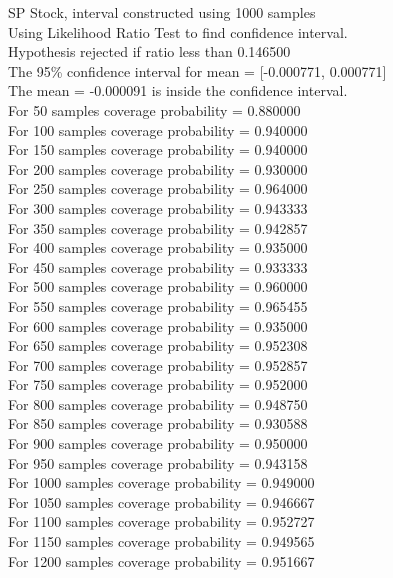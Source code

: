 \documentclass{article}
\begin{document}
SP Stock, interval constructed using 1000 samples\\
Using Likelihood Ratio Test to find confidence interval.\\
Hypothesis rejected if ratio less than 0.146500\\
The 95\% confidence interval for mean = [-0.000771, 0.000771]\\
The mean = -0.000091 is inside the confidence interval.\\
For 50 samples coverage probability = 0.880000\\
For 100 samples coverage probability = 0.940000\\
For 150 samples coverage probability = 0.940000\\
For 200 samples coverage probability = 0.930000\\
For 250 samples coverage probability = 0.964000\\
For 300 samples coverage probability = 0.943333\\
For 350 samples coverage probability = 0.942857\\
For 400 samples coverage probability = 0.935000\\
For 450 samples coverage probability = 0.933333\\
For 500 samples coverage probability = 0.960000\\
For 550 samples coverage probability = 0.965455\\
For 600 samples coverage probability = 0.935000\\
For 650 samples coverage probability = 0.952308\\
For 700 samples coverage probability = 0.952857\\
For 750 samples coverage probability = 0.952000\\
For 800 samples coverage probability = 0.948750\\
For 850 samples coverage probability = 0.930588\\
For 900 samples coverage probability = 0.950000\\
For 950 samples coverage probability = 0.943158\\
For 1000 samples coverage probability = 0.949000\\
For 1050 samples coverage probability = 0.946667\\
For 1100 samples coverage probability = 0.952727\\
For 1150 samples coverage probability = 0.949565\\
For 1200 samples coverage probability = 0.951667\\
\end{document}
